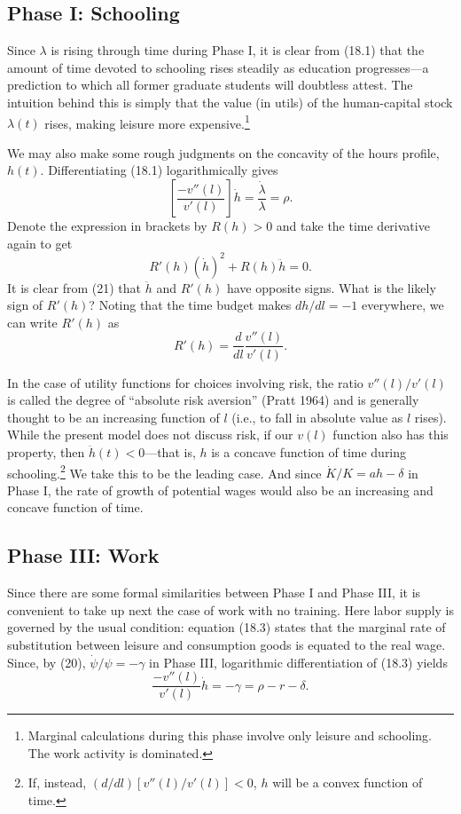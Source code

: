 \documentclass[11pt,fleqn]{article}
\begin{document}
\subsection{Phase I: Schooling}

Since $\lambda$ is rising through time during Phase I, it is clear from (18.1) that the amount of time devoted to schooling rises steadily as education progresses---a prediction to which all former graduate students will doubtless attest. The intuition behind this is simply that the value (in utils) of the human-capital stock $\lambda(t)$ rises, making leisure more expensive.\footnote{Marginal calculations during this phase involve only leisure and schooling. The work activity is dominated.}

We may also make some rough judgments on the concavity of the hours profile, $h(t)$. Differentiating (18.1) logarithmically gives
\[
\left[\frac{-v''(l)}{v'(l)}\right] \dot{h} = \frac{\dot{\lambda}}{\lambda} = \rho.
\]
Denote the expression in brackets by $R(h) > 0$ and take the time derivative again to get
\begin{equation}
R'(h)(\dot{h})^2 + R(h)\ddot{h} = 0.
\end{equation}
It is clear from (21) that $\ddot{h}$ and $R'(h)$ have opposite signs. What is the likely sign of $R'(h)$? Noting that the time budget makes $dh/dl = -1$ everywhere, we can write $R'(h)$ as
\[
R'(h) = \frac{d}{dl} \frac{v''(l)}{v'(l)}.
\]

In the case of utility functions for choices involving risk, the ratio $v''(l)/v'(l)$ is called the degree of ``absolute risk aversion'' (Pratt 1964) and is generally thought to be an increasing function of $l$ (i.e., to fall in absolute value as $l$ rises). While the present model does not discuss risk, if our $v(l)$ function also has this property, then $\ddot{h}(t) < 0$---that is, $h$ is a concave function of time during schooling.\footnote{If, instead, $(d/dl) [v''(l)/v'(l)] < 0$, $h$ will be a convex function of time.} We take this to be the leading case. And since $\dot{K}/K = ah - \delta$ in Phase I, the rate of growth of potential wages would also be an increasing and concave function of time.

\subsection{Phase III: Work}

Since there are some formal similarities between Phase I and Phase III, it is convenient to take up next the case of work with no training. Here labor supply is governed by the usual condition: equation (18.3) states that the marginal rate of substitution between leisure and consumption goods is equated to the real wage. Since, by (20), $\dot{\psi}/\psi = -\gamma$ in Phase III, logarithmic differentiation of (18.3) yields
\begin{equation}
\frac{-v''(l)}{v'(l)} \dot{h} = -\gamma = \rho - r - \delta.
\end{equation}
\end{document}
